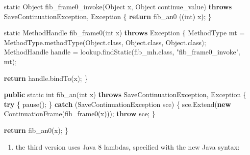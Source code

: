 \documentclass[12pt,a4paper,oneside,openright]{book}
\newenvironment{Shaded}{\begin{snugshade}}{\end{snugshade}}
\newcommand{\KeywordTok}[1]{\textcolor[rgb]{0.13,0.29,0.53}{\textbf{{#1}}}}
\newcommand{\DataTypeTok}[1]{\textcolor[rgb]{0.13,0.29,0.53}{{#1}}}
\newcommand{\StringTok}[1]{\textcolor[rgb]{0.31,0.60,0.02}{{#1}}}
\newcommand{\FunctionTok}[1]{\textcolor[rgb]{0.00,0.00,0.00}{{#1}}}
\newcommand{\NormalTok}[1]{{#1}}
\providecommand{\tightlist}{%
  \setlength{\itemsep}{0pt}\setlength{\parskip}{0pt}}
\begin{document}
\begin{Shaded}
\begin{Highlighting}[]
    \DataTypeTok{static} \NormalTok{Object }\FunctionTok{fib_frame0_invoke}\NormalTok{(Object x, Object continue_value)}
            \KeywordTok{throws} \NormalTok{SaveContinuationException, Exception \{}
         \KeywordTok{return} \FunctionTok{fib_an0} \NormalTok{((}\DataTypeTok{int}\NormalTok{) x);}
    \NormalTok{\}}

    \DataTypeTok{static} \NormalTok{MethodHandle }\FunctionTok{fib_frame0}\NormalTok{(}\DataTypeTok{int} \NormalTok{x)}
            \KeywordTok{throws} \NormalTok{Exception \{}
        \NormalTok{MethodType mt = MethodType.}\FunctionTok{methodType}\NormalTok{(Object.}\FunctionTok{class}\NormalTok{,}
                                              \NormalTok{Object.}\FunctionTok{class}\NormalTok{,}
                                              \NormalTok{Object.}\FunctionTok{class}\NormalTok{);}
        \NormalTok{MethodHandle handle = lookup.}\FunctionTok{findStatic}\NormalTok{(fib_mh.}\FunctionTok{class}\NormalTok{,}
                                                \StringTok{"fib_frame0_invoke"}\NormalTok{,}
                                                \NormalTok{mt);}

        \KeywordTok{return} \NormalTok{handle.}\FunctionTok{bindTo}\NormalTok{(x);}
    \NormalTok{\}}

    \KeywordTok{public} \DataTypeTok{static} \DataTypeTok{int} \FunctionTok{fib_an}\NormalTok{(}\DataTypeTok{int} \NormalTok{x)}
           \KeywordTok{throws} \NormalTok{SaveContinuationException, Exception \{}
        \KeywordTok{try} \NormalTok{\{}
            \FunctionTok{pause}\NormalTok{();}
        \NormalTok{\} }\KeywordTok{catch} \NormalTok{(SaveContinuationException sce) \{}
            \NormalTok{sce.}\FunctionTok{Extend}\NormalTok{(}\KeywordTok{new} \FunctionTok{ContinuationFrame}\NormalTok{(}\FunctionTok{fib_frame0}\NormalTok{(x)));}
            \KeywordTok{throw} \NormalTok{sce;}
        \NormalTok{\}}

        \KeywordTok{return} \FunctionTok{fib_an0}\NormalTok{(x);}
    \NormalTok{\}}
\end{Highlighting}
\end{Shaded}

\begin{enumerate}
\def\labelenumi{\arabic{enumi}.}
\setcounter{enumi}{2}
\tightlist
\item
  the third version uses Java 8 lambdas, specified with the new Java
  syntax:
\end{enumerate}
\end{document}
